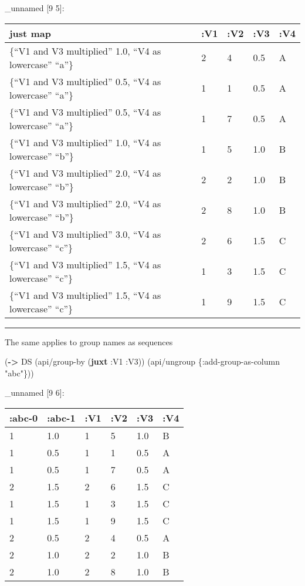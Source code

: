 \documentclass[]{article}
\newenvironment{Shaded}{\begin{snugshade}}{\end{snugshade}}
\newcommand{\AttributeTok}[1]{\textcolor[rgb]{0.77,0.63,0.00}{#1}}
\newcommand{\KeywordTok}[1]{\textcolor[rgb]{0.13,0.29,0.53}{\textbf{#1}}}
\newcommand{\NormalTok}[1]{#1}
\newcommand{\StringTok}[1]{\textcolor[rgb]{0.31,0.60,0.02}{#1}}
\begin{document}
\_unnamed {[}9 5{]}:

\begin{longtable}[]{@{}lllll@{}}
\toprule
just map & :V1 & :V2 & :V3 & :V4\tabularnewline
\midrule
\endhead
\{``V1 and V3 multiplied'' 1.0, ``V4 as lowercase'' ``a''\} & 2 & 4 &
0.5 & A\tabularnewline
\{``V1 and V3 multiplied'' 0.5, ``V4 as lowercase'' ``a''\} & 1 & 1 &
0.5 & A\tabularnewline
\{``V1 and V3 multiplied'' 0.5, ``V4 as lowercase'' ``a''\} & 1 & 7 &
0.5 & A\tabularnewline
\{``V1 and V3 multiplied'' 1.0, ``V4 as lowercase'' ``b''\} & 1 & 5 &
1.0 & B\tabularnewline
\{``V1 and V3 multiplied'' 2.0, ``V4 as lowercase'' ``b''\} & 2 & 2 &
1.0 & B\tabularnewline
\{``V1 and V3 multiplied'' 2.0, ``V4 as lowercase'' ``b''\} & 2 & 8 &
1.0 & B\tabularnewline
\{``V1 and V3 multiplied'' 3.0, ``V4 as lowercase'' ``c''\} & 2 & 6 &
1.5 & C\tabularnewline
\{``V1 and V3 multiplied'' 1.5, ``V4 as lowercase'' ``c''\} & 1 & 3 &
1.5 & C\tabularnewline
\{``V1 and V3 multiplied'' 1.5, ``V4 as lowercase'' ``c''\} & 1 & 9 &
1.5 & C\tabularnewline
\bottomrule
\end{longtable}

\begin{center}\rule{0.5\linewidth}{0.5pt}\end{center}

The same applies to group names as sequences

\begin{Shaded}
\begin{Highlighting}[]
\NormalTok{(}\KeywordTok{->}\NormalTok{ DS}
\NormalTok{    (api/group-by (}\KeywordTok{juxt} \AttributeTok{:V1} \AttributeTok{:V3}\NormalTok{))}
\NormalTok{    (api/ungroup \{}\AttributeTok{:add-group-as-column} \StringTok{"abc"}\NormalTok{\}))}
\end{Highlighting}
\end{Shaded}

\_unnamed {[}9 6{]}:

\begin{longtable}[]{@{}llllll@{}}
\toprule
:abc-0 & :abc-1 & :V1 & :V2 & :V3 & :V4\tabularnewline
\midrule
\endhead
1 & 1.0 & 1 & 5 & 1.0 & B\tabularnewline
1 & 0.5 & 1 & 1 & 0.5 & A\tabularnewline
1 & 0.5 & 1 & 7 & 0.5 & A\tabularnewline
2 & 1.5 & 2 & 6 & 1.5 & C\tabularnewline
1 & 1.5 & 1 & 3 & 1.5 & C\tabularnewline
1 & 1.5 & 1 & 9 & 1.5 & C\tabularnewline
2 & 0.5 & 2 & 4 & 0.5 & A\tabularnewline
2 & 1.0 & 2 & 2 & 1.0 & B\tabularnewline
2 & 1.0 & 2 & 8 & 1.0 & B\tabularnewline
\bottomrule
\end{longtable}
\end{document}
